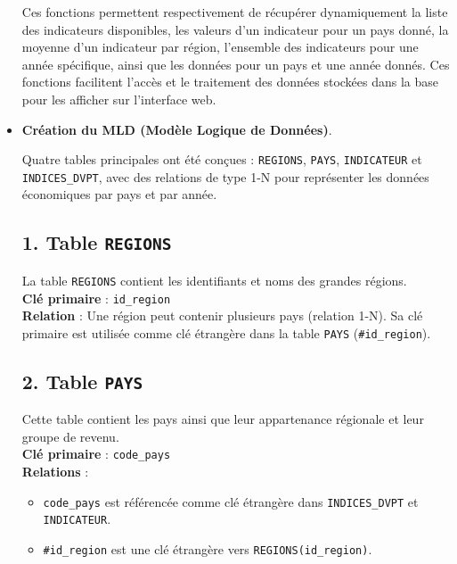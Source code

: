 \documentclass[11pt]{article}
\begin{document}
\begin{itemize}
    \vspace{0.2cm}
    
    Ces fonctions permettent respectivement de récupérer dynamiquement la liste des indicateurs disponibles, les valeurs d’un indicateur pour un pays donné, la moyenne d’un indicateur par région, l’ensemble des indicateurs pour une année spécifique, ainsi que les données pour un pays et une année donnés. Ces fonctions facilitent l’accès et le traitement des données stockées dans la base pour les afficher sur l’interface web.

    \vspace{0.2cm}
    
    \item \textbf{Création du MLD (Modèle Logique de Données)}.
    
    \vspace{0.2cm}

    
    
Quatre tables principales ont été conçues : \texttt{REGIONS}, \texttt{PAYS}, \texttt{INDICATEUR} et \texttt{INDICES\_DVPT}, avec des relations de type 1-N pour représenter les données économiques par pays et par année.

\subsection*{1. Table \texttt{REGIONS}}
La table \texttt{REGIONS} contient les identifiants et noms des grandes régions. \\
\textbf{Clé primaire} : \texttt{id\_region} \\
\textbf{Relation} : Une région peut contenir plusieurs pays (relation 1-N). Sa clé primaire est utilisée comme clé étrangère dans la table \texttt{PAYS} (\texttt{\#id\_region}).

\subsection*{2. Table \texttt{PAYS}}
Cette table contient les pays ainsi que leur appartenance régionale et leur groupe de revenu. \\
\textbf{Clé primaire} : \texttt{code\_pays} \\
\textbf{Relations} :
\begin{itemize}
  \item \texttt{code\_pays} est référencée comme clé étrangère dans \texttt{INDICES\_DVPT} et \texttt{INDICATEUR}.
  \item \texttt{\#id\_region} est une clé étrangère vers \texttt{REGIONS(id\_region)}.
\end{itemize}


\end{itemize}
\end{document}
